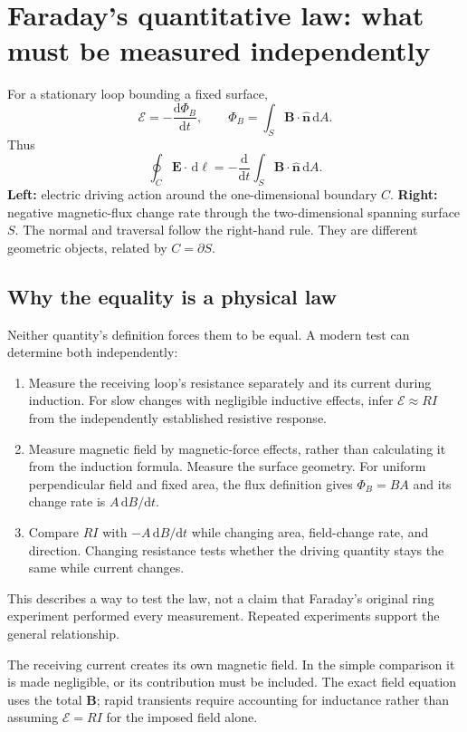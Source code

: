 \documentclass[11pt,letterpaper]{article}
\newcommand{\vect}[1]{\boldsymbol{#1}}
\newcommand{\dd}{\,\mathrm d}
\begin{document}
\section{Faraday's quantitative law: what must be measured independently}
For a stationary loop bounding a fixed surface,
\begin{equation}
\boxed{\mathcal E=-\frac{\mathrm d\Phi_B}{\mathrm dt},\qquad
\Phi_B=\int_S\vect B\cdot\hat{\vect n}\dd A.}
\end{equation}
Thus
\begin{equation}
\boxed{\oint_C\vect E\cdot\dd\vect\ell
=-\frac{\mathrm d}{\mathrm dt}\int_S\vect B\cdot\hat{\vect n}\dd A.}
\end{equation}
\textbf{Left:} electric driving action around the one-dimensional boundary $C$. \textbf{Right:} negative magnetic-flux change rate through the two-dimensional spanning surface $S$. The normal and traversal follow the right-hand rule. They are different geometric objects, related by $C=\partial S$.

\subsection*{Why the equality is a physical law}
Neither quantity's definition forces them to be equal. A modern test can determine both independently:
\begin{enumerate}
\item Measure the receiving loop's resistance separately and its current during induction. For slow changes with negligible inductive effects, infer $\mathcal E\approx RI$ from the independently established resistive response.
\item Measure magnetic field by magnetic-force effects, rather than calculating it from the induction formula. Measure the surface geometry. For uniform perpendicular field and fixed area, the flux definition gives $\Phi_B=BA$ and its change rate is $A\,\mathrm dB/\mathrm dt$.
\item Compare $RI$ with $-A\,\mathrm dB/\mathrm dt$ while changing area, field-change rate, and direction. Changing resistance tests whether the driving quantity stays the same while current changes.
\end{enumerate}
This describes a way to test the law, not a claim that Faraday's original ring experiment performed every measurement. Repeated experiments support the general relationship.\cite{faraday}

The receiving current creates its own magnetic field. In the simple comparison it is made negligible, or its contribution must be included. The exact field equation uses the total $\vect B$; rapid transients require accounting for inductance rather than assuming $\mathcal E=RI$ for the imposed field alone.
\end{document}
